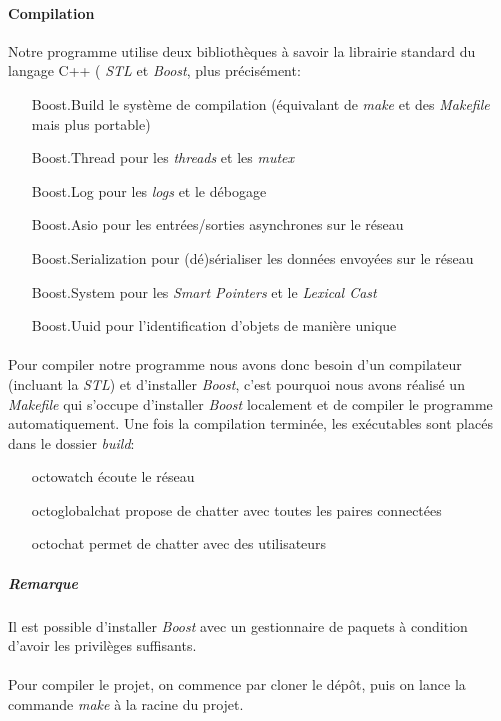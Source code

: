 \documentclass[a4paper]{article}
\begin{document}
			\paragraph{Compilation}{
			Notre programme utilise deux bibliothèques à savoir la librairie standard du langage C++ ( \textit{STL} et \textit{Boost}, plus précisément:
			\begin{itemize}
				\item[Boost.Build] le système de compilation (équivalant de \textit{make} et des \textit{Makefile} mais plus portable)
				\item[Boost.Thread] pour les \textit{threads} et les \textit{mutex}
				\item[Boost.Log] pour les \textit{logs} et le débogage
				\item[Boost.Asio] pour les entrées/sorties asynchrones sur le réseau
				\item[Boost.Serialization] pour (dé)sérialiser les données envoyées sur le réseau
				\item[Boost.System] pour les \textit{Smart Pointers} et le \textit{Lexical Cast}
				\item[Boost.Uuid] pour l'identification d'objets de manière unique
			\end{itemize}
			}
			\paragraph{}{
			Pour compiler notre programme nous avons donc besoin d’un compilateur (incluant la \textit{STL})
			et d’installer \textit{Boost}, c’est pourquoi nous avons réalisé un \textit{Makefile} qui s’occupe
			d’installer \textit{Boost} localement et de compiler le programme automatiquement.
			Une fois la compilation terminée, les exécutables sont placés dans le dossier \textit{build}:
			\begin{itemize}
				\item[\textsf{octowatch}] écoute le réseau
				\item[\textsf{octoglobalchat}] propose de chatter avec toutes les paires connectées
				\item[\textsf{octochat}] permet de chatter avec des utilisateurs
			\end{itemize}

			}
			\subparagraph{Remarque}{
				Il est possible d’installer \textit{Boost} avec un gestionnaire de paquets à condition d’avoir les privilèges suffisants.
			}


			\paragraph{}{
				Pour compiler le projet, on commence par cloner le dépôt, puis on lance la commande \textit{make} à la racine du projet.
			}
\end{document}
